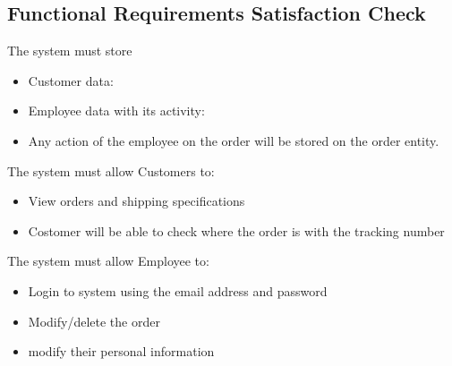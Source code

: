 \subsection{Functional Requirements Satisfaction Check}

The system must store
\begin{itemize}
	\item Customer data:
\end{itemize}
\begin{itemize}
	\item Employee data with its activity:
	\item Any action of the employee on the order will be stored on the order entity.
\end{itemize}

The system must allow Customers to:
\begin{itemize}
	\item View orders and shipping specifications
	\item Costomer will be able to check where the order is with the tracking number
\end{itemize}

The system must allow Employee to:
\begin{itemize}
	\item Login to system using the email address and password
	\item Modify/delete the order
	\item modify their personal information
\end{itemize}